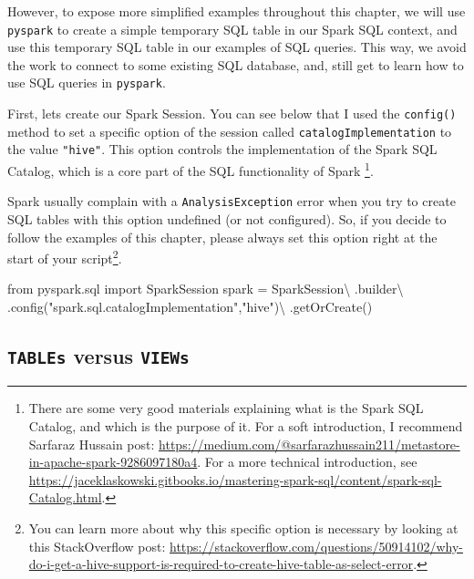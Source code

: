 \documentclass[
  11pt,
  letterpaper,
  DIV=11,
  numbers=noendperiod]{scrreprt}
\newenvironment{Shaded}{\begin{snugshade}}{\end{snugshade}}
\newcommand{\ImportTok}[1]{\textcolor[rgb]{0.00,0.46,0.62}{#1}}
\newcommand{\NormalTok}[1]{\textcolor[rgb]{0.00,0.23,0.31}{#1}}
\newcommand{\OperatorTok}[1]{\textcolor[rgb]{0.37,0.37,0.37}{#1}}
\newcommand{\StringTok}[1]{\textcolor[rgb]{0.13,0.47,0.30}{#1}}
\begin{document}
However, to expose more simplified examples throughout this chapter, we
will use \texttt{pyspark} to create a simple temporary SQL table in our
Spark SQL context, and use this temporary SQL table in our examples of
SQL queries. This way, we avoid the work to connect to some existing SQL
database, and, still get to learn how to use SQL queries in
\texttt{pyspark}.

First, lets create our Spark Session. You can see below that I used the
\texttt{config()} method to set a specific option of the session called
\texttt{catalogImplementation} to the value \texttt{"hive"}. This option
controls the implementation of the Spark SQL Catalog, which is a core
part of the SQL functionality of Spark \footnote{There are some very
  good materials explaining what is the Spark SQL Catalog, and which is
  the purpose of it. For a soft introduction, I recommend Sarfaraz
  Hussain post:
  \url{https://medium.com/@sarfarazhussain211/metastore-in-apache-spark-9286097180a4}.
  For a more technical introduction, see
  \url{https://jaceklaskowski.gitbooks.io/mastering-spark-sql/content/spark-sql-Catalog.html}.}.

Spark usually complain with a \texttt{AnalysisException} error when you
try to create SQL tables with this option undefined (or not configured).
So, if you decide to follow the examples of this chapter, please always
set this option right at the start of your script\footnote{You can learn
  more about why this specific option is necessary by looking at this
  StackOverflow post:
  \url{https://stackoverflow.com/questions/50914102/why-do-i-get-a-hive-support-is-required-to-create-hive-table-as-select-error}.}.

\begin{Shaded}
\begin{Highlighting}[]
\ImportTok{from}\NormalTok{ pyspark.sql }\ImportTok{import}\NormalTok{ SparkSession}
\NormalTok{spark }\OperatorTok{=}\NormalTok{ SparkSession}\OperatorTok{\textbackslash{}}
\NormalTok{  .builder}\OperatorTok{\textbackslash{}}
\NormalTok{  .config(}\StringTok{"spark.sql.catalogImplementation"}\NormalTok{,}\StringTok{"hive"}\NormalTok{)}\OperatorTok{\textbackslash{}}
\NormalTok{  .getOrCreate()}
\end{Highlighting}
\end{Shaded}

\subsection{\texorpdfstring{\texttt{TABLEs} versus
\texttt{VIEWs}}{TABLEs versus VIEWs}}\label{tables-versus-views}
\end{document}
